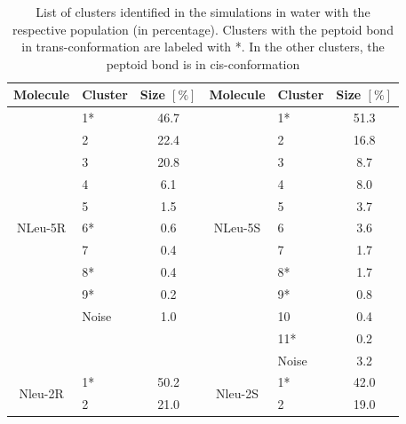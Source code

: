 \begin{table}[h!]
\center
\caption{ List  of  clusters  identified  in  the  simulations  in  water  with  the  respective 
population  (in  percentage).  Clusters  with  the  peptoid  bond  in  trans-conformation  are 
labeled with *. In the other clusters, the peptoid bond is in cis-conformation}
\label{tab: SIClusterTransWater}
  \begin{adjustbox}{max width=\textwidth}
\begin{tabular}{c|lc||c|lc}
Molecule                  & Cluster & Size $[\%]$ & Molecule                  & Cluster & Size $[\%]$ \\
\hline
\multirow{11}{*}{NLeu-5R} & 1*      & 46.7        & \multirow{11}{*}{NLeu-5S} & 1*      & 51.3        \\
                          & 2       & 22.4       &                            & 2       & 16.8        \\
                          & 3       & 20.8        &                           & 3       & 8.7         \\
                          & 4       & 6.1        &                            & 4       & 8.0         \\
                          & 5       & 1.5        &                            & 5       & 3.7         \\
                          & 6*      & 0.6         &                           & 6       & 3.6         \\
                          & 7       & 0.4         &                           & 7       & 1.7         \\
                          & 8*      & 0.4         &                           & 8*      & 1.7         \\
                          & 9*      & 0.2         &                           & 9*      & 0.8         \\
                          & Noise   & 1.0         &                           & 10      & 0.4         \\
                          &         &             &                           & 11*     & 0.2         \\
                          &         &             &                           & Noise   & 3.2        \\
\hline
\multirow{6}{*}{Nleu-2R}  & 1*      & 50.2        & \multirow{13}{*}{Nleu-2S} & 1*      & 42.0        \\
                          & 2       & 21.0        &                           & 2       & 19.0        \\

\end{tabular}
\end{adjustbox}
\end{table}
